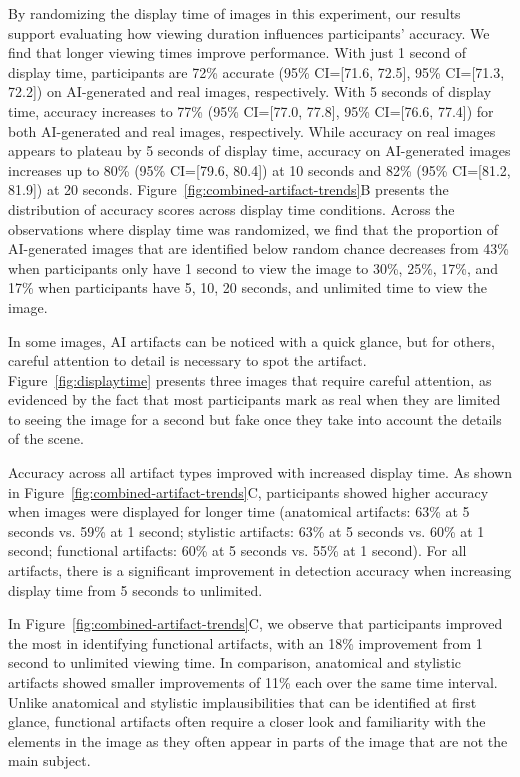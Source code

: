 By randomizing the display time of images in this experiment, our results support evaluating how viewing duration influences participants' accuracy. We find that longer viewing times improve performance. With just 1 second of display time, participants are  72\% accurate (95\% CI=[71.6, 72.5], 95\% CI=[71.3, 72.2]) on AI-generated and real images, respectively. With 5 seconds of display time, accuracy increases to 77\% (95\% CI=[77.0, 77.8], 95\% CI=[76.6, 77.4]) for both AI-generated and real images, respectively. While accuracy on real images appears to plateau by 5 seconds of display time, accuracy on AI-generated images increases up to 80\% (95\% CI=[79.6, 80.4]) at 10 seconds and 82\% (95\% CI=[81.2, 81.9]) at 20 seconds. Figure~\ref{fig:combined-artifact-trends}B presents the distribution of accuracy scores across display time conditions. Across the observations where display time was randomized, we find that the proportion of AI-generated images that are identified below random chance decreases from 43\% when participants only have 1 second to view the image to 30\%, 25\%, 17\%, and 17\% when participants have 5, 10, 20 seconds, and unlimited time to view the image.

In some images, AI artifacts can be noticed with a quick glance, but for others, careful attention to detail is necessary to spot the artifact. Figure~\ref{fig:displaytime} presents three images that require careful attention, as evidenced by the fact that most participants mark as real when they are limited to seeing the image for a second but
fake once they take into account the details of the scene.

Accuracy across all artifact types improved with increased display time. As shown in Figure~\ref{fig:combined-artifact-trends}C, participants showed higher accuracy when images were displayed for longer time (anatomical artifacts: 63\% at 5 seconds vs. 59\% at 1 second; stylistic artifacts: 63\% at 5 seconds vs. 60\% at 1 second; functional artifacts: 60\% at 5 seconds vs. 55\% at 1 second). For all artifacts, there is a significant improvement in detection accuracy when increasing display time from 5 seconds to unlimited. 

In Figure~\ref{fig:combined-artifact-trends}C, we observe that participants improved the most in identifying functional artifacts, with an 18\% improvement from 1 second to unlimited viewing time. In comparison, anatomical and stylistic artifacts showed smaller improvements of 11\% each over the same time interval. Unlike anatomical and stylistic implausibilities that can be identified at first glance, functional artifacts often require a closer look and familiarity with the elements in the image as they often appear in parts of the image that are not the main subject. 


